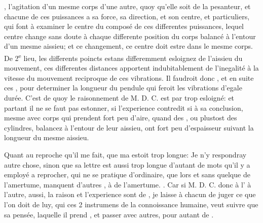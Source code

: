 \documentclass[11pt,a4paper]{article}
\begin{document}
\ill{} \ill{}, \ill{} \ill{} l'agitation d'un mesme corps \ill{} d'une autre, quoy qu'elle soit \ill{} de la pesanteur, et chacune de ces puissances a sa force, sa direction, et son centre, \ill{} et particuliers, qui font à examiner le centre du composé de ces differentes puissances, lequel centre change sans doute à chaque differente position du corps balancé à l'entour d'un mesme aissieu; et  ce changement, ce centre doit estre  dans le mesme corps. De 2\textsuperscript{e} lieu, les differents poincts estans differemment esloignez de l'aissieu du mouvement, ces differentes distances apportent indubitablement de l'inegalité à la vitesse du mouvement reciproque de ces vibrations. Il faudroit donc , et en suite \ill{} ces , pour determiner la longueur du pendule qui feroit les vibrations d'egale durée. C'est de quoy le raisonnement de M. D. C. est par trop esloigné: et partant il ne se faut pas estonner, si l'experience contredit si  à sa conclusion, mesme avec corps qui prendent fort peu d'aire, quand \ill{} \ill{} des , ou plustost des cylindres, balancez à l'entour de leur aissieu, ont \ill{} fort peu d'espaisseur suivant la longueur du mesme aissieu.

Quant au reproche qu'il me fait, que ma \ill{} estoit trop longue: Je n'y respondray autre chose, sinon que sa lettre est aussi trop longue d'autant de mots qu'il y a employé a \ill{} reprocher, qui ne se pratique d'ordinaire, que lors \ill{} \ill{} et sans \ill{} quelque \ill{} de l'amertume, \ill{} manquent d'autres \ill{}, \ill{} à \ill{} de l'amertume. \ill{} \ill{}. Car si M. D. C. \ill{} \ill{} donc à l' \add{\ill{} \ill{}} à l'autre, \ill{} aussi, la raison et l'experience sont de \ill{} \ill{}, je laisse à chacun de juger ce que l'on doit \ill{} de luy, qui  ces 2 instrumens de la connoissance humaine, \ill{} veut suivre que sa pensée, laquelle il \struck{\ill{}} prend , et \ill{} \ill{} passer avec autres, pour autant de .
\end{document}
